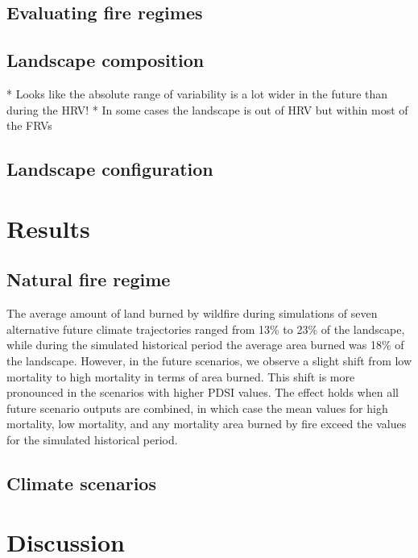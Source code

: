 \documentclass[12pt]{article}
\begin{document}
\begin{spacing}{1}
\subsection*{Evaluating fire regimes}


\subsection*{Landscape composition}

* Looks like the absolute range of variability is a lot wider in the future than during the HRV!
* In some cases the landscape is out of HRV but within most of the FRVs


\subsection*{Landscape configuration}

\section*{Results}

\subsection*{Natural fire regime}
The average amount of land burned by wildfire during simulations of seven alternative future climate trajectories ranged from 13\% to 23\% of the landscape, while during the simulated historical period the average area burned was 18\% of the landscape. However, in the future scenarios, we observe a slight shift from low mortality to high mortality in terms of area burned. This shift is more pronounced in the scenarios with higher PDSI values. The effect holds when all future scenario outputs are combined, in which case the mean values for high mortality, low mortality, and any mortality area burned by fire exceed the values for the simulated historical period.




\subsection*{Climate scenarios}


\section*{Discussion}


\end{spacing}
\end{document}
